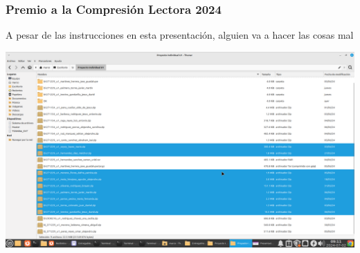 \begin{frame}
\frametitle{Premio a la Compresión Lectora 2024}
A pesar de las instrucciones en esta presentación, alguien va a hacer las cosas mal
\begin{center}
\includegraphics[width=0.75\linewidth]{Entregables/PremioAlaComprensionLectora_2024.png}
\end{center}


\end{frame}


